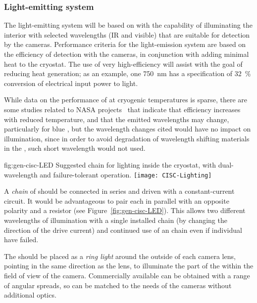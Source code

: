 \subsubsection{Light-emitting system}
The light-emitting system will be based on  with the capability of illuminating the interior with selected
wavelengths (IR and visible) that are suitable for detection by the
cameras.  Performance criteria for the light-emission system are based
on the efficiency of detection with the cameras, in conjunction with
adding minimal heat to the cryostat. The use of very high-efficiency
 will assist with the goal of reducing heat generation; as an
example, one \SI{750}{nm}  has a specification of
\SI{32}{\%} conversion of electrical input power to light.

While data on the performance of  at cryogenic temperatures is sparse,
there are some studies related to NASA projects~\cite{Carron:2017zzz} that
indicate that  efficiency increases with reduced temperature,
and that the emitted wavelengths may change, particularly for blue ,
but the wavelength changes cited would have no impact on illumination, since
in order  to avoid degradation of wavelength
shifting materials in the ,
such short wavelength  would not used.

\begin{dunefigure}{fig:gen-cisc-LED}
  {Suggested  chain for lighting inside the cryostat, with
    dual-wavelength and failure-tolerant operation.}
\texttt{[image: CISC-Lighting]}
\end{dunefigure}

A \textit{chain} of  should be connected in series and driven with a
constant-current circuit. It would be advantageous to pair each
 in parallel with an opposite polarity  and a resistor
(see Figure~\ref{fig:gen-cisc-LED}).
This allows two different wavelengths of illumination with a single installed
chain (by changing the direction of the drive current) and 
continued use of an  chain even if individual  have failed.

The  should be placed as a \textit{ring light} around the outside of each
camera lens, pointing in the same direction as the lens, to 
illuminate the part of the  within the field of
view of the camera. Commercially available  can be obtained with
a range of angular spreads, so can be matched to the needs of the
cameras without additional optics. 

